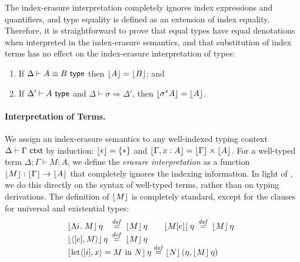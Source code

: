 The index-erasure interpretation completely ignores index expressions
and quantifiers, and type equality is defined as an extension of index
equality. Therefore, it is straightforward to prove that equal types
have equal denotations when interpreted in the index-erasure
semantics, and that substitution of index terms has no effect on the
index-erasure interpretation of types:
\begin{lemma}\label{lem:tyeqsubst-erasure}
  \begin{enumerate}
  \item If $\Delta \vdash A \equiv B \textup{\textsf{ type}}$ then $\left\lfloor A \right\rfloor =
    \left\lfloor B \right\rfloor$; and
  \item If $\Delta' \vdash A \textup{\textsf{ type}}$ and $\Delta \vdash \sigma
    \Rightarrow \Delta'$, then $\left\lfloor \sigma^*A \right\rfloor = \left\lfloor A \right\rfloor$.
  \end{enumerate}
\end{lemma}

\paragraph{Interpretation of Terms.}


We assign an index-erasure semantics to any well-indexed typing
context $\Delta \vdash \Gamma \textup{\textsf{ ctxt}}$ by induction:
$\left\lfloor \epsilon \right\rfloor = \{*\}$ and $\left\lfloor \Gamma, x : A \right\rfloor =
\left\lfloor \Gamma \right\rfloor \times \left\lfloor A \right\rfloor$. For a well-typed term $\Delta;
\Gamma \vdash M : A$, we define the \emph{erasure interpretation} as a
function $\left\lfloor{M}\right\rfloor : \left\lfloor \Gamma \right\rfloor \to \left\lfloor A \right\rfloor$ that completely
ignores the indexing information. In light of
, we do this %
directly on the syntax of well-typed terms, rather than on typing
derivations. The definition of $\left\lfloor{M}\right\rfloor$ is completely standard,
except for the clauses for universal and existential types:
\begin{displaymath}
  \begin{array}{@{}l}
    \begin{array}{@{}l@{\hspace{0.5em}}c@{\hspace{0.5em}}l@{\hspace{2em}}l@{\hspace{0.5em}}c@{\hspace{0.5em}}l@{}}
      \tmSem{\Lambda i.\ M}\eta & \isDefinedAs & \tmSem{M}\eta
      &
      \tmSem{M[e]}\eta & \isDefinedAs & \tmSem{M}\eta \\
      \tmSem{\langle [e], M\rangle}\eta & \isDefinedAs & \tmSem{M}\eta
    \end{array} \\
    \tmSem{\mathrm{let}\langle[i], x\rangle = M\ \mathrm{in}\ N}\eta \isDefinedAs \tmSem{N}(\eta, \tmSem{M}\eta)
  \end{array}
\end{displaymath}

